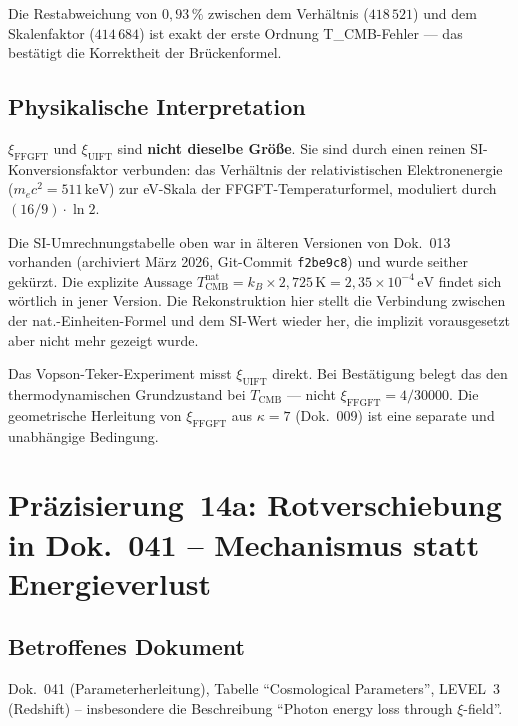 Die Restabweichung von $0{,}93\,\%$ zwischen dem Verhältnis ($418\,521$) und dem
Skalenfaktor ($414\,684$) ist exakt der erste Ordnung T\_CMB-Fehler — das
bestätigt die Korrektheit der Brückenformel.

\subsection*{Physikalische Interpretation}

$\xi_\text{FFGFT}$ und $\xi_\text{UIFT}$ sind \textbf{nicht dieselbe Größe}.
Sie sind durch einen reinen SI-Konversionsfaktor verbunden: das Verhältnis der
relativistischen Elektronenergie ($m_ec^2 = 511\,\text{keV}$) zur eV-Skala der
FFGFT-Temperaturformel, moduliert durch $(16/9)\cdot\ln 2$.

Die SI-Umrechnungstabelle oben war in älteren Versionen von Dok.~013 vorhanden
(archiviert März 2026, Git-Commit \texttt{f2be9c8}) und wurde seither gekürzt.
Die explizite Aussage
$T_\text{CMB}^\text{nat} = k_B \times 2{,}725\,\text{K} = 2{,}35\times10^{-4}\,\text{eV}$
findet sich wörtlich in jener Version. Die Rekonstruktion hier stellt die
Verbindung zwischen der nat.-Einheiten-Formel und dem SI-Wert wieder her,
die implizit vorausgesetzt aber nicht mehr gezeigt wurde.

Das Vopson-Teker-Experiment misst $\xi_\text{UIFT}$ direkt.
Bei Bestätigung belegt das den thermodynamischen Grundzustand bei $T_\text{CMB}$ —
nicht $\xi_\text{FFGFT} = 4/30000$.
Die geometrische Herleitung von $\xi_\text{FFGFT}$ aus $\kappa = 7$ (Dok.~009)
ist eine separate und unabhängige Bedingung.


\section{\texorpdfstring{Präzisierung~14a: Rotverschiebung in Dok.~041 -- Mechanismus statt Energieverlust}{Praezisierung 14a: Rotverschiebung in Dok. 041 -- Mechanismus statt Energieverlust}}

\subsection*{Betroffenes Dokument}

Dok.~041 (Parameterherleitung), Tabelle \enquote{Cosmological Parameters},
LEVEL~3 (Redshift) -- insbesondere die Beschreibung
\enquote{Photon energy loss through $\xi$-field}.

